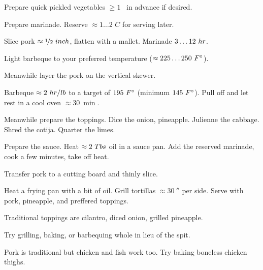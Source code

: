 \begin{preparation}
\item Prepare quick pickled vegetables $\ge 1$ \week~in advance if desired.

\item Prepare marinade.
	Reserve $\approx 1 \dots 2$ $C$ for serving later.

\item Slice pork $\approx \onehalf~\inch$, flatten with a mallet.
	Marinade $3 \dots 12~\hour$.

\item Light barbeque to your preferred temperature ($\approx 225 \dots 250~\Fahrenheit$).

\item Meanwhile layer the pork on the vertical skewer.

\item Barbeque $\approx 2~\hour / \pound$ to a target of $195~\Fahrenheit$ (minimum $145~\Fahrenheit$).
	Pull off and let rest in a cool oven $\approx 30~\min$.

\item Meanwhile prepare the toppings.
	Dice the onion, pineapple.
	Julienne the cabbage.
	Shred the cotija.
	Quarter the limes.

\item Prepare the sauce.
	Heat $\approx 2~\Tablespoon$ oil in a sauce pan.
	Add the reserved marinade, cook a few minutes, take off heat.

\item Transfer pork to a cutting board and thinly slice.

\item Heat a frying pan with a bit of oil.
	Grill tortillas $\approx 30~\second$ per side.
	Serve with pork, pineapple, and preffered toppings.
\end{preparation}


\begin{variation}
\item Traditional toppings are cilantro, diced onion, grilled pineapple.

\item Try grilling, baking, or barbequing whole in lieu of the spit.

\item Pork is traditional but chicken and fish work too.
	Try baking boneless chicken thighs.
\end{variation}


\recipeend
